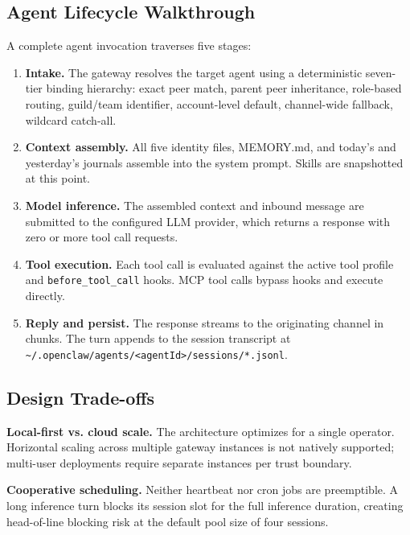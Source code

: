 \documentclass[journal]{IEEEtran}
\begin{document}
\subsection{Agent Lifecycle Walkthrough}

A complete agent invocation traverses five stages:

\begin{enumerate}
\item \textbf{Intake.} The gateway resolves the target agent using a
deterministic seven-tier binding hierarchy: exact peer match, parent peer
inheritance, role-based routing, guild/team identifier, account-level default,
channel-wide fallback, wildcard catch-all.

\item \textbf{Context assembly.} All five identity files, MEMORY.md, and
today's and yesterday's journals assemble into the system prompt. Skills are
snapshotted at this point.

\item \textbf{Model inference.} The assembled context and inbound message are
submitted to the configured LLM provider, which returns a response with zero
or more tool call requests.

\item \textbf{Tool execution.} Each tool call is evaluated against the active
tool profile and \texttt{before\_tool\_call} hooks. MCP tool calls bypass
hooks and execute directly.

\item \textbf{Reply and persist.} The response streams to the originating
channel in chunks. The turn appends to the session transcript at
\texttt{\textasciitilde/.openclaw/agents/<agentId>/sessions/*.jsonl}.
\end{enumerate}

\subsection{Design Trade-offs}

\textbf{Local-first vs. cloud scale.} The architecture optimizes for a single
operator. Horizontal scaling across multiple gateway instances is not natively
supported; multi-user deployments require separate instances per trust boundary.

\textbf{Cooperative scheduling.} Neither heartbeat nor cron jobs are
preemptible. A long inference turn blocks its session slot for the full
inference duration, creating head-of-line blocking risk at the default pool
size of four sessions.
\end{document}

